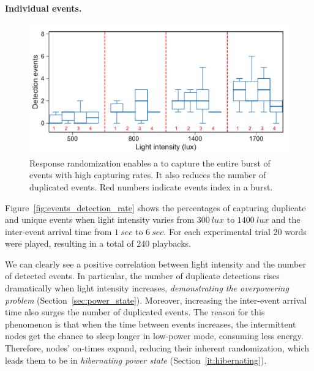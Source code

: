 \paragraph{Individual events.}
\begin{figure}[t]
	\centering
     \includegraphics[width=\columnwidth]{figures/events_burst_rand}
    \caption{Response randomization enables a \sys to capture the entire burst of events with high capturing rates. It also reduces the number of duplicated events. Red numbers indicate events index in a burst.}
    \label{fig:events_burst_rand}
\end{figure}

Figure~\ref{fig:events_detection_rate} shows the percentages of capturing duplicate and unique events when light intensity varies from $\SI{300}{lux}$ to $\SI{1400}{lux}$ and the inter-event arrival time from $\SI{1}{sec}$ to $\SI{6}{sec}$. For each experimental trial 20 words were played, resulting in a total of 240 playbacks. 

We can clearly see a positive correlation between light intensity and the number of detected events. In particular, the number of duplicate detections rises dramatically when light intensity increases, \emph{demonstrating the overpowering problem} (Section~\ref{sec:power_state}). Moreover, increasing the inter-event arrival time also surges the number of duplicated events. The reason for this phenomenon is that when the time between events increases, the intermittent nodes get the chance to sleep longer in low-power mode, consuming less energy. Therefore, nodes' on-times expand, reducing their inherent randomization, which leads them to be in \textit{hibernating power state} (Section~\ref{it:hibernating}).  


